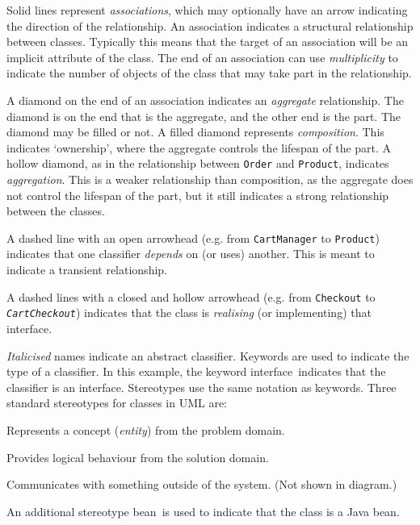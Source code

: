 Solid lines represent \emph{associations}, which may optionally have an arrow indicating the direction of the relationship.
An association indicates a structural relationship between classes.
Typically this means that the target of an association will be an implicit attribute of the class.
The end of an association can use \emph{multiplicity} to indicate the number of objects of the class that may take part in the relationship.

A diamond on the end of an association indicates an \emph{aggregate} relationship.
The diamond is on the end that is the aggregate, and the other end is the part.
The diamond may be filled or not. A filled diamond represents \emph{composition}.
This indicates `ownership', where the aggregate controls the lifespan of the part.
A hollow diamond, as in the relationship between \texttt{Order} and \texttt{Product},
indicates \emph{aggregation}.
This is a weaker relationship than composition, as the aggregate does not control the lifespan of the part,
but it still indicates a strong relationship between the classes.

A dashed line with an open arrowhead (e.g. from \texttt{CartManager} to \texttt{Product})
indicates that one classifier \emph{depends} on (or uses) another. This is meant to indicate a transient relationship.

A dashed lines with a closed and hollow arrowhead (e.g. from \texttt{Checkout} to \texttt{\textsl{CartCheckout}})
indicates that the class is \emph{realising} (or implementing) that interface.

\textit{Italicised} names indicate an abstract classifier. Keywords are used to indicate the type of a classifier.
In this example, the keyword \guillemotleft interface\guillemotright~indicates that the classifier is an interface.
Stereotypes use the same notation as keywords. Three standard stereotypes for classes in UML are:
\begin{description}[nosep,left=5mm]
    \item[\guillemotleft entity\guillemotright] Represents a concept (\emph{entity}) from the problem domain.
    \item[\guillemotleft control\guillemotright] Provides logical behaviour from the solution domain.
    \item[\guillemotleft boundary\guillemotright] Communicates with something outside of the system. (Not shown in diagram.)
\end{description}
An additional stereotype \guillemotleft bean\guillemotright~is used to indicate that the class is a Java bean.

